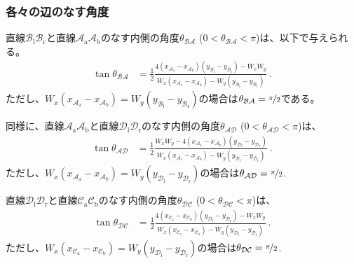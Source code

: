 \subsubsection{各々の辺のなす角度}
直線$\mathcal B_\mathrm l\mathcal B_\mathrm r$と直線$\mathcal A_\mathrm a\mathcal A_\mathrm b$のなす内側の角度$\theta_{\mathcal{BA}}$ ($0 < \theta_{\mathcal{BA}} < \pi$)は、以下で与えられる。
\begin{align*}
  \tan\theta_{\mathcal{BA}}
  &= \frac12
     \frac{4\left(x_{\mathcal A_\mathrm a}-x_{\mathcal A_\mathrm b}\right)
            \left(y_{\mathcal B_\mathrm l}-y_{\mathcal B_\mathrm r}\right)
           -W_xW_y}
          {W_x\left(x_{\mathcal A_\mathrm a}-x_{\mathcal A_\mathrm b}\right)
           -W_y\left(y_{\mathcal B_\mathrm l}-y_{\mathcal B_\mathrm r}\right)}\ .
\end{align*}
ただし、$W_x\left(x_{\mathcal A_\mathrm a}-x_{\mathcal A_\mathrm b}\right) = W_y\left(y_{\mathcal B_\mathrm l}-y_{\mathcal B_\mathrm r}\right)$の場合は$\theta_{\mathcal{BA}} = \nicefrac\pi2$である。

同様に、直線$\mathcal A_\mathrm a\mathcal A_\mathrm b$と直線$\mathcal D_\mathrm l\mathcal D_\mathrm r$のなす内側の角度$\theta_{\mathcal{AD}}$ ($0 < \theta_{\mathcal{AD}} < \pi$)は、
\begin{align*}
  \tan\theta_{\mathcal{AD}}
  &= \frac12
     \frac{W_xW_y
           -4\left(x_{\mathcal A_\mathrm a}-x_{\mathcal A_\mathrm b}\right)
             \left(y_{\mathcal D_\mathrm l}-y_{\mathcal D_\mathrm r}\right)}
          {W_x\left(x_{\mathcal A_\mathrm a}-x_{\mathcal A_\mathrm b}\right)
           -W_y\left(y_{\mathcal D_\mathrm l}-y_{\mathcal D_\mathrm r}\right)}\ .
\end{align*}
ただし、$W_x\left(x_{\mathcal A_\mathrm a}-x_{\mathcal A_\mathrm b}\right) = W_y\left(y_{\mathcal D_\mathrm l}-y_{\mathcal D_\mathrm r}\right)$の場合は$\theta_{\mathcal{AD}} = \nicefrac\pi2$.

直線$\mathcal D_\mathrm l\mathcal D_\mathrm r$と直線$\mathcal C_\mathrm a\mathcal C_\mathrm b$のなす内側の角度$\theta_{\mathcal{DC}}$ ($0 < \theta_{\mathcal{DC}} < \pi$)は、
\begin{align*}
  \tan\theta_{\mathcal{DC}}
  &= \frac12
     \frac{4\left(x_{\mathcal C_\mathrm a}-x_{\mathcal C_\mathrm b}\right)
            \left(y_{\mathcal D_\mathrm l}-y_{\mathcal D_\mathrm r}\right)
           -W_xW_y}
          {W_x\left(x_{\mathcal C_\mathrm a}-x_{\mathcal C_\mathrm b}\right)
           -W_y\left(y_{\mathcal D_\mathrm l}-y_{\mathcal D_\mathrm r}\right)}\ .
\end{align*}
ただし、$W_x\left(x_{\mathcal C_\mathrm a}-x_{\mathcal C_\mathrm b}\right) = W_y\left(y_{\mathcal D_\mathrm l}-y_{\mathcal D_\mathrm r}\right)$の場合は$\theta_{\mathcal{DC}} = \nicefrac\pi2$.

